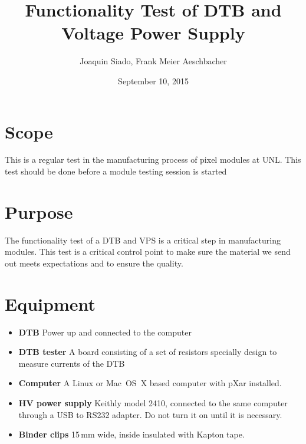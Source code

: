 \documentclass[12pt]{unlsilabsop}
\title{Functionality Test of DTB and Voltage Power Supply}
\date{September 10, 2015}
\author{Joaquin Siado, Frank Meier Aeschbacher}
\begin{document}
\maketitle

\section{Scope}
This is a regular test in the manufacturing process of pixel modules at UNL. This test should be done before a module testing session is started

\section{Purpose}
The functionality test of a DTB and VPS is a critical step in manufacturing modules. This test is a critical control point to make sure the material we send out meets expectations and to ensure the quality. 



\section{Equipment}

\begin{itemize}
\item \textbf{DTB} Power up and connected to the computer
\item \textbf{DTB tester} A board consisting of a set of resistors specially design to measure currents of the DTB
\item \textbf{Computer} A Linux or Mac~OS~X based computer with pXar installed.
\item \textbf{HV power supply} Keithly model 2410, connected to the same computer through a USB to RS232 adapter. Do not turn it on until it is necessary.
\item \textbf{Binder clips} 15\,mm wide, inside insulated with Kapton tape.
\end{itemize}
\end{document}
